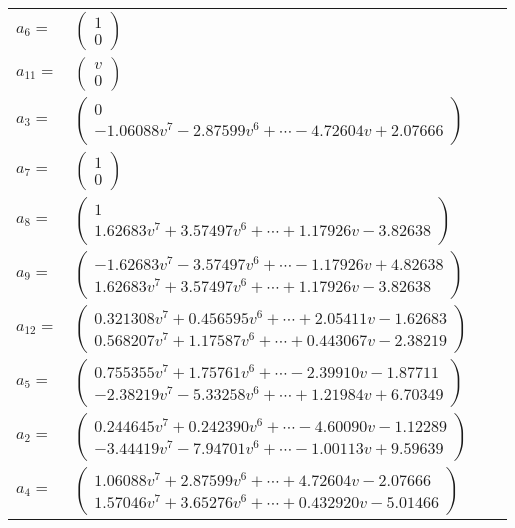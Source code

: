 \documentclass[1p]{elsarticle_modified}
\theoremstyle{definition}
\begin{document}
\begin{tabular}{m{7pt} m{180pt} m{7pt} m{180pt} }
\flushright $a_{6}=$&$\begin{pmatrix}1\\0\end{pmatrix}$ \\
\flushright $a_{11}=$&$\begin{pmatrix}v\\0\end{pmatrix}$ \\
\flushright $a_{3}=$&$\begin{pmatrix}0\\-1.06088 v^{7}-2.87599 v^{6}+\cdots-4.72604 v+2.07666\end{pmatrix}$ \\
\flushright $a_{7}=$&$\begin{pmatrix}1\\0\end{pmatrix}$ \\
\flushright $a_{8}=$&$\begin{pmatrix}1\\1.62683 v^{7}+3.57497 v^{6}+\cdots+1.17926 v-3.82638\end{pmatrix}$ \\
\flushright $a_{9}=$&$\begin{pmatrix}-1.62683 v^{7}-3.57497 v^{6}+\cdots-1.17926 v+4.82638\\1.62683 v^{7}+3.57497 v^{6}+\cdots+1.17926 v-3.82638\end{pmatrix}$ \\
\flushright $a_{12}=$&$\begin{pmatrix}0.321308 v^{7}+0.456595 v^{6}+\cdots+2.05411 v-1.62683\\0.568207 v^{7}+1.17587 v^{6}+\cdots+0.443067 v-2.38219\end{pmatrix}$ \\
\flushright $a_{5}=$&$\begin{pmatrix}0.755355 v^{7}+1.75761 v^{6}+\cdots-2.39910 v-1.87711\\-2.38219 v^{7}-5.33258 v^{6}+\cdots+1.21984 v+6.70349\end{pmatrix}$ \\
\flushright $a_{2}=$&$\begin{pmatrix}0.244645 v^{7}+0.242390 v^{6}+\cdots-4.60090 v-1.12289\\-3.44419 v^{7}-7.94701 v^{6}+\cdots-1.00113 v+9.59639\end{pmatrix}$ \\
\flushright $a_{4}=$&$\begin{pmatrix}1.06088 v^{7}+2.87599 v^{6}+\cdots+4.72604 v-2.07666\\1.57046 v^{7}+3.65276 v^{6}+\cdots+0.432920 v-5.01466\end{pmatrix}$ \\

\end{tabular}
\end{document}
